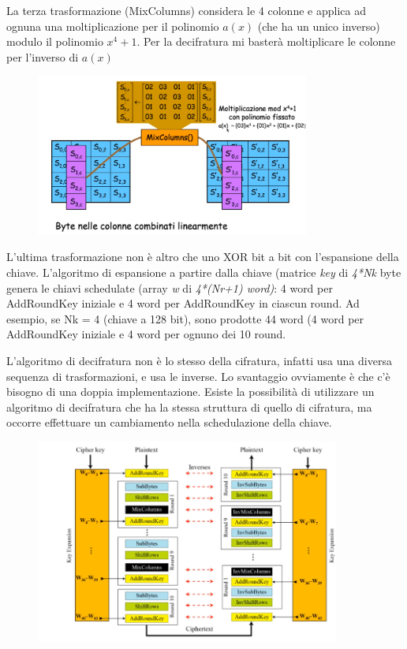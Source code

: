 La terza trasformazione (MixColumns) considera le 4 colonne e applica ad ognuna una moltiplicazione per il polinomio $a(x)$ (che ha un unico inverso) modulo il polinomio $x^{4} + 1$. Per la decifratura mi basterà moltiplicare le colonne per l'inverso di $a(x)$

\begin{figure}[htb!]
    \centering
    \includegraphics[width=9cm]{./Images/cap1/1.27.png}
\end{figure} 

L'ultima trasformazione non è altro che uno XOR bit a bit con l'espansione della chiave. L'algoritmo di espansione a partire dalla chiave (matrice \textit{key} di \textit{4*Nk} byte genera le chiavi schedulate (array \textit{w} di \textit{4*(Nr+1) word)}: 4 word per AddRoundKey iniziale e 4 word per AddRoundKey in ciascun round. Ad esempio, se Nk = 4 (chiave a 128 bit), sono prodotte 44 word (4 word per AddRoundKey iniziale e 4 word per ognuno dei 10 round.

L'algoritmo di decifratura non è lo stesso della cifratura, infatti usa una diversa sequenza di trasformazioni, e usa le inverse. Lo svantaggio ovviamente è che c'è bisogno di una doppia implementazione. Esiste la possibilità di utilizzare un algoritmo di decifratura che ha la stessa struttura di quello di cifratura, ma occorre effettuare un cambiamento nella schedulazione della chiave.

\begin{figure}[htb!]
    \centering
    \includegraphics[width=10cm]{./Images/cap1/1.28.png}
\end{figure} 


